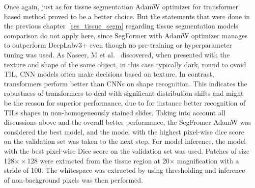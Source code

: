 Once again, just as for tissue segmentation AdamW optimizer for transformer
based method proved to be a better choice. 
But the statements that were done in the previous chapter~\ref{res_tissue_segm}
regarding tissue segmentation models comparison do not apply here, since SegFormer with AdamW
optimizer manages to outperform DeepLabv3+ even though no pre-training
or hyperparameter tuning was used. 
As Naseer, M et al.~\cite{naseer2021intriguing} discovered, when presented
with the texture and shape of the same object, in this case typically dark,
round to ovoid TIL, CNN models often make decisions based on texture. In contrast,
transformers perform better than CNNs on shape recognition. This indicates the
robustness of transformers to deal with significant distribution shifts and might
be the reason for superior performance, due to for instance better recognition of
TILs shapes in non-homogeneously stained slides. Taking into account all
discussions above and the overall better performance, the SegFromer AdamW was
considered the best model, and the model with the highest pixel-wise dice score
on the validation set was taken to the next step. 
For model inference, the model with the best pixel-wise Dice score on the validation set was used.
Patches of size 128$×\times$128 were extracted from the tissue region at 20$\times$ magnification
with a stride of 100. The whitespace was extracted by using thresholding and
inference of non-background pixels was then performed.

